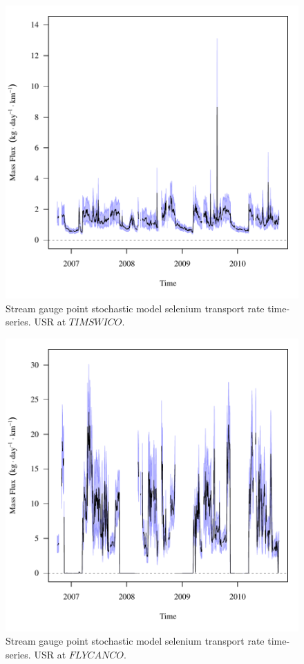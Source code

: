 \begin{figure}[htbp]
	\begin{center}
	\includegraphics[width=6in]{"Figures/Results_USR/f TIM"}
	\caption{Stream gauge point stochastic model selenium transport rate time-series.  USR at $TIMSWICO$.}
	\end{center}
\end{figure}
\newpage

\begin{figure}[htbp]
	\begin{center}
	\includegraphics[width=6in]{"Figures/Results_USR/f FLY"}
	\caption{Stream gauge point stochastic model selenium transport rate time-series.  USR at $FLYCANCO$.}
	\end{center}
\end{figure}
\newpage

